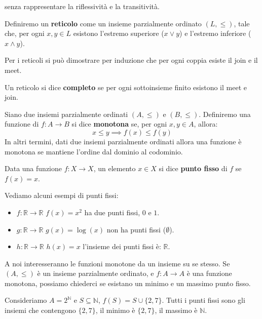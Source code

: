 senza rappresentare la riflessività e la transitività.
\begin{definizione}
    Definiremo un \textbf{reticolo} come un insieme parzialmente ordinato $(L,
        \leq)$, tale che, per ogni $x,y\in L$ esistono l'estremo superiore ($x
        \lor y$) e l'estremo inferiore ($x \land y$).
\end{definizione}
Per i reticoli si può dimostrare per induzione che per ogni coppia esiste il join
e il meet.
\begin{definizione}
    Un reticolo si dice \textbf{completo} se per ogni sottoinsieme finito esistono
    il meet e join.
\end{definizione}
\begin{definizione}
    Siano due insiemi parzialmente ordinati $(A,\leq)$ e $(B,\leq)$. Definiremo
    una funzione di $f: A \to B$ si dice \textbf{monotona} se, per ogni $x, y
        \in A$, allora:
    \begin{equation}
        x \leq y \implies f(x) \leq f(y)
    \end{equation}
    In altri termini, dati due insiemi parzialmente ordinati allora una funzione
    è monotona se mantiene l'ordine dal dominio al codominio.
\end{definizione}
\begin{definizione}
    Data una funzione $f: X \to X$, un elemento $x \in X$ si dice \textbf{punto
        fisso} di $f$ se $f(x) = x$.
\end{definizione}
\begin{esempio}
    Vediamo alcuni esempi di punti fissi:
    \begin{itemize}
        \item $f: \mathbb{R} \to \mathbb{R}$ $f(x) = x^2$ ha due punti fissi,
              $0$ e $1$.
        \item $g: \mathbb{R} \to \mathbb{R}$ $g(x) = \log(x)$ non ha punti fissi
              ($\emptyset$).
        \item $h: \mathbb{R} \to \mathbb{R}$ $h(x) = x$ l'insieme dei punti fissi
              è: $\mathbb{R}$.
    \end{itemize}
\end{esempio}
A noi interesseranno le funzioni monotone da un insieme su se stesso.
Se $(A, \leq)$ è un insieme parzialmente ordinato, e $f: A \to A$ è una funzione
monotona, possiamo chiederci se esistano un minimo e un massimo punto fisso.
\begin{esempio}
    Consideriamo $A = 2^\mathbb{N}$ e $S\subseteq \mathbb{N}$, $f(S)=S\cup \{2,7\}$.
    Tutti i punti fissi sono gli insiemi che contengono $\{2,7\}$, il minimo è
    $\{2,7\}$, il massimo è $\mathbb{N}$.
\end{esempio}
